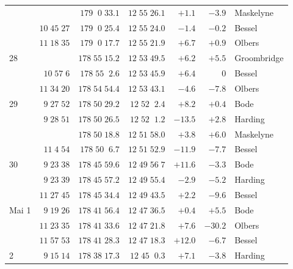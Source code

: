 \begin{longtable}{lrrrrrl}
 &  & $179\;\;0\;33.1$ & $12\;55\;26.1$ & $+1.1$ & $-3.9$ & Maskelyne \\
 & $10\;45\;27$ & $179\;\;0\;25.4$ & $12\;55\;24.0$ & $-1.4$ & $-0.2$ & Bessel \\
 & $11\;18\;35$ & $179\;\;0\;17.7$ & $12\;55\;21.9$ & $+6.7$ & $+0.9$ & Olbers \\
28 &  & $178\;55\;15.2$ & $12\;53\;49.5$ & $+6.2$ & $+5.5$ & Groombridge \\
 & $10\;57\;6$ & $178\;55\;\;2.6$ & $12\;53\;45.9$ & $+6.4$ & $0$ & Bessel \\
 & $11\;34\;20$ & $178\;54\;54.4$ & $12\;53\;43.1$ & $-4.6$ & $-7.8$ & Olbers \\
29 & $9\;27\;52$ & $178\;50\;29.2$ & $12\;52\;\;2.4$ & $+8.2$ & $+0.4$ & Bode \\
 & $9\;28\;51$ & $178\;50\;26.5$ & $12\;52\;\;1.2$ & $-13.5$ & $+2.8$ & Harding \\
 &  & $178\;50\;18.8$ & $12\;51\;58.0$ & $+3.8$ & $+6.0$ & Maskelyne \\
 & $11\;4\;54$ & $178\;50\;\;6.7$ & $12\;51\;52.9$ & $-11.9$ & $-7.7$ & Bessel \\
30 & $9\;23\;38$ & $178\;45\;59.6$ & $12\;49\;56\;7$ & $+11.6$ & $-3.3$ & Bode \\
 & $9\;23\;39$ & $178\;45\;57.2$ & $12\;49\;55.4$ & $-2.9$ & $-5.2$ & Harding \\
 & $11\;27\;45$ & $178\;45\;34.4$ & $12\;49\;43.5$ & $+2.2$ & $-9.6$ & Bessel \\
Mai 1 & $9\;19\;26$ & $178\;41\;56.4$ & $12\;47\;36.5$ & $+0.4$ & $+5.5$ & Bode \\
 & $11\;23\;35$ & $178\;41\;33.6$ & $12\;47\;21.8$ & $+7.6$ & $-30.2$ & Olbers \\
 & $11\;57\;53$ & $178\;41\;28.3$ & $12\;47\;18.3$ & $+12.0$ & $-6.7$ & Bessel \\
2 & $9\;15\;14$ & $178\;38\;17.3$ & $12\;45\;\;0.3$ & $+7.1$ & $-3.8$ & Harding \\
\end{longtable}
\endgroup

